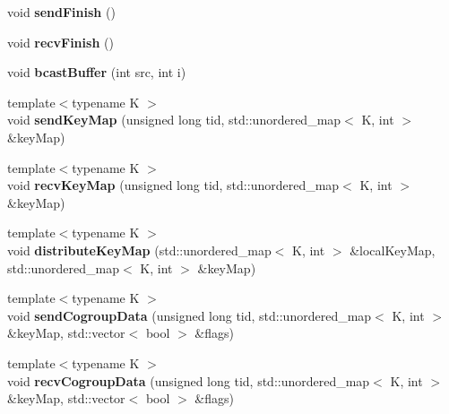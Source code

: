 \begin{DoxyCompactItemize}
void {\bfseries send\+Finish} ()
\item 
\hypertarget{classfaster_1_1fastComm_a252c0e9fe5cb45739e4499d096fb0588}{}\label{classfaster_1_1fastComm_a252c0e9fe5cb45739e4499d096fb0588} 
void {\bfseries recv\+Finish} ()
\item 
\hypertarget{classfaster_1_1fastComm_a8dede6b029fddf4b2196cf5d47dceb7a}{}\label{classfaster_1_1fastComm_a8dede6b029fddf4b2196cf5d47dceb7a} 
void {\bfseries bcast\+Buffer} (int src, int i)
\item 
\hypertarget{classfaster_1_1fastComm_a90b5d29b062108758932e1eefa22ab64}{}\label{classfaster_1_1fastComm_a90b5d29b062108758932e1eefa22ab64} 
{\footnotesize template$<$typename K $>$ }\\void {\bfseries send\+Key\+Map} (unsigned long tid, std\+::unordered\+\_\+map$<$ K, int $>$ \&key\+Map)
\item 
\hypertarget{classfaster_1_1fastComm_a4367717fa6627c940d777204a26b0a89}{}\label{classfaster_1_1fastComm_a4367717fa6627c940d777204a26b0a89} 
{\footnotesize template$<$typename K $>$ }\\void {\bfseries recv\+Key\+Map} (unsigned long tid, std\+::unordered\+\_\+map$<$ K, int $>$ \&key\+Map)
\item 
\hypertarget{classfaster_1_1fastComm_abbe080b793ea0051e9c4ddfe81f47604}{}\label{classfaster_1_1fastComm_abbe080b793ea0051e9c4ddfe81f47604} 
{\footnotesize template$<$typename K $>$ }\\void {\bfseries distribute\+Key\+Map} (std\+::unordered\+\_\+map$<$ K, int $>$ \&local\+Key\+Map, std\+::unordered\+\_\+map$<$ K, int $>$ \&key\+Map)
\item 
\hypertarget{classfaster_1_1fastComm_a1794035cdede41cb34034aa85fd510c3}{}\label{classfaster_1_1fastComm_a1794035cdede41cb34034aa85fd510c3} 
{\footnotesize template$<$typename K $>$ }\\void {\bfseries send\+Cogroup\+Data} (unsigned long tid, std\+::unordered\+\_\+map$<$ K, int $>$ \&key\+Map, std\+::vector$<$ bool $>$ \&flags)
\item 
\hypertarget{classfaster_1_1fastComm_ae7cea23c2c6dc47ac9e115685163d0c9}{}\label{classfaster_1_1fastComm_ae7cea23c2c6dc47ac9e115685163d0c9} 
{\footnotesize template$<$typename K $>$ }\\void {\bfseries recv\+Cogroup\+Data} (unsigned long tid, std\+::unordered\+\_\+map$<$ K, int $>$ \&key\+Map, std\+::vector$<$ bool $>$ \&flags)
\item 
\hypertarget{classfaster_1_1fastComm_ac4faadb2677abcae51a0248db2408d6f}{}\label{classfaster_1_1fastComm_ac4faadb2677abcae51a0248db2408d6f} 

\end{DoxyCompactItemize}
